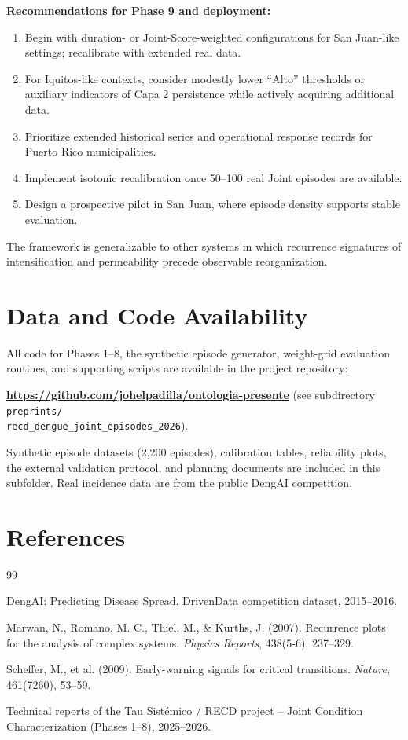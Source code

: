 \documentclass[11pt,a4paper]{article}
\begin{document}
\textbf{Recommendations for Phase 9 and deployment:}
\begin{enumerate}
    \item Begin with duration- or Joint-Score-weighted configurations for San Juan-like settings; recalibrate with extended real data.
    \item For Iquitos-like contexts, consider modestly lower “Alto” thresholds or auxiliary indicators of Capa 2 persistence while actively acquiring additional data.
    \item Prioritize extended historical series and operational response records for Puerto Rico municipalities.
    \item Implement isotonic recalibration once 50--100 real Joint episodes are available.
    \item Design a prospective pilot in San Juan, where episode density supports stable evaluation.
\end{enumerate}

The framework is generalizable to other systems in which recurrence signatures of intensification and permeability precede observable reorganization.

\section*{Data and Code Availability}

All code for Phases 1--8, the synthetic episode generator, weight-grid evaluation routines, and supporting scripts are available in the project repository:

\textbf{\url{https://github.com/johelpadilla/ontologia-presente}} (see subdirectory \texttt{preprints/\\recd\_dengue\_joint\_episodes\_2026}).

Synthetic episode datasets (2,200 episodes), calibration tables, reliability plots, the external validation protocol, and planning documents are included in this subfolder. Real incidence data are from the public DengAI competition.

\section*{References}
\begin{thebibliography}{99}

DengAI: Predicting Disease Spread. DrivenData competition dataset, 2015--2016.

Marwan, N., Romano, M. C., Thiel, M., \& Kurths, J. (2007). Recurrence plots for the analysis of complex systems. \textit{Physics Reports}, 438(5-6), 237--329.

Scheffer, M., et al. (2009). Early-warning signals for critical transitions. \textit{Nature}, 461(7260), 53--59.

Technical reports of the Tau Sistémico / RECD project – Joint Condition Characterization (Phases 1--8), 2025--2026.

\end{thebibliography}
\end{document}
